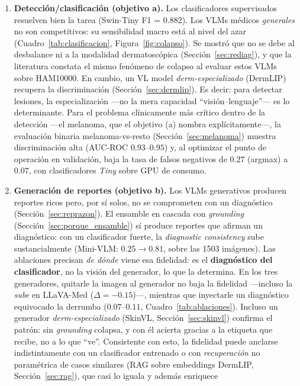 \documentclass[11pt, a4paper]{article}
\begin{document}
\begin{enumerate}[leftmargin=1.6em]
  \item \textbf{Detección/clasificación (objetivo a).} Los clasificadores supervisados resuelven bien la
  tarea (Swin-Tiny F1 = 0.882). Los VLMs médicos \emph{generales} no son competitivos: su sensibilidad
  macro está al nivel del azar (Cuadro~\ref{tab:clasificacion}, Figura~\ref{fig:colapso}). Se mostró que
  no se debe al desbalance ni a la modalidad dermatoscópica (Sección~\ref{sec:rediag}), y que la
  literatura constata el mismo fenómeno de colapso al evaluar estos VLMs sobre HAM10000. En cambio, un
  VL model \emph{derm-especializado} (DermLIP) recupera la discriminación
  (Sección~\ref{sec:dermlip}). Es decir: para detectar lesiones, la especialización —no la mera
  capacidad ``visión--lenguaje''— es lo determinante. Para el problema clínicamente más crítico dentro de
  la detección —el melanoma, que el objetivo (a) nombra explícitamente—, la evaluación binaria
  melanoma-vs-resto (Sección~\ref{sec:melanoma}) muestra discriminación alta (AUC-ROC $0.93$--$0.95$) y,
  al optimizar el punto de operación en validación, baja la tasa de falsos negativos de $0.27$ (argmax) a
  $0.07$, con clasificadores \emph{Tiny} sobre GPU de consumo.
  \item \textbf{Generación de reportes (objetivo b).} Los VLMs generativos producen reportes ricos pero,
  por sí solos, no se comprometen con un diagnóstico (Sección~\ref{sec:reprazon}). El ensamble en
  cascada con \emph{grounding} (Sección~\ref{sec:porque_ensamble}) sí produce reportes que afirman un
  diagnóstico: con un clasificador fuerte, la \emph{diagnostic consistency} sube sustancialmente
  (Mini-VLM: $0.25 \rightarrow 0.81$, sobre las 1503 imágenes). Las ablaciones precisan \emph{de dónde} viene esa fidelidad: es el
  \textbf{diagnóstico del clasificador}, no la visión del generador, lo que la determina. En los tres
  generadores, quitarle la imagen al generador no baja la fidelidad —incluso la \emph{sube} en LLaVA-Med
  ($\Delta=-0.15$)—, mientras que inyectarle un diagnóstico equivocado la derrumba ($0.07$--$0.11$,
  Cuadro~\ref{tab:ablaciones}). Incluso un generador \emph{derm-especializado} (SkinVL,
  Sección~\ref{sec:skinvl}) confirma el patrón: sin \emph{grounding} colapsa, y con él acierta gracias a
  la etiqueta que recibe, no a lo que ``ve''. Consistente con esto, la fidelidad puede anclarse
  indistintamente con un clasificador entrenado o con \emph{recuperación} no paramétrica de casos
  similares (RAG sobre embeddings DermLIP, Sección~\ref{sec:rag}), que casi lo iguala y además enriquece

\end{enumerate}
\end{document}

